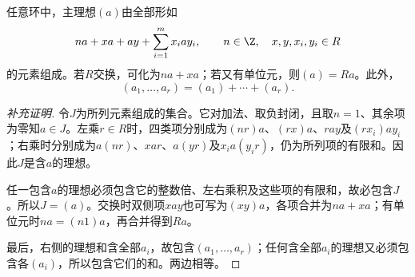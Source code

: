\begin{proposition}
任意环中，主理想$(a)$由全部形如
\[
na+xa+ay+\sum_{i=1}^m x_iay_i,
\qquad n\in\Z,\quad x,y,x_i,y_i\in R
\]
的元素组成。若$R$交换，可化为$na+xa$；若又有单位元，则$(a)=Ra$。此外，
\[
(a_1,\ldots,a_r)=(a_1)+\cdots+(a_r).
\]
\end{proposition}
\begin{proof}[补充证明]
令$J$为所列元素组成的集合。它对加法、取负封闭，且取$n=1$、其余项为零知$a\in J$。左乘$r\in R$时，四类项分别成为$(nr)a$、$(rx)a$、$ray$及$(rx_i)ay_i$；右乘时分别成为$a(nr)$、$xar$、$a(yr)$及$x_i a(y_ir)$，仍为所列项的有限和。因此$J$是含$a$的理想。

任一包含$a$的理想必须包含它的整数倍、左右乘积及这些项的有限和，故必包含$J$。所以$J=(a)$。交换时双侧项$xay$也可写为$(xy)a$，各项合并为$na+xa$；有单位元时$na=(n1)a$，再合并得到$Ra$。

最后，右侧的理想和含全部$a_i$，故包含$(a_1,\ldots,a_r)$；任何含全部$a_i$的理想又必须包含各$(a_i)$，所以包含它们的和。两边相等。
\end{proof}
